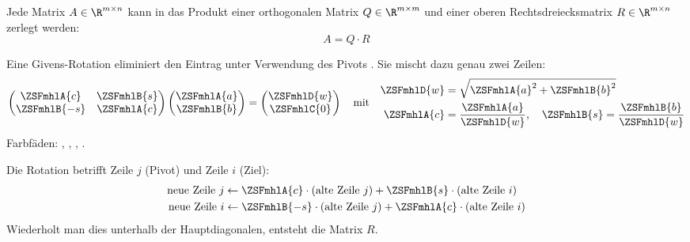 
\begin{defbox}[QR-Zerlegung]
Jede Matrix $A \in \R^{m \times n}$ kann in das Produkt einer orthogonalen Matrix $Q \in \R^{m \times m}$  und einer oberen Rechtsdreiecksmatrix $R \in \R^{m \times n}$ zerlegt werden:
\[ A = Q \cdot R \]
\end{defbox}

\begin{defbox}
Eine Givens-Rotation eliminiert den Eintrag  unter Verwendung des Pivots . Sie mischt dazu genau zwei Zeilen:
\[
\begin{pmatrix} \ZSFmhlA{c} & \ZSFmhlB{s} \\ \ZSFmhlB{-s} & \ZSFmhlA{c} \end{pmatrix}
\begin{pmatrix} \ZSFmhlA{a} \\ \ZSFmhlB{b} \end{pmatrix}
=
\begin{pmatrix} \ZSFmhlD{w} \\ \ZSFmhlC{0} \end{pmatrix}
\quad \text{mit} \quad
\begin{aligned}
\ZSFmhlD{w}&=\sqrt{\ZSFmhlA{a}^2+\ZSFmhlB{b}^2}\\
\ZSFmhlA{c}&=\frac{\ZSFmhlA{a}}{\ZSFmhlD{w}}, \quad \ZSFmhlB{s}=\frac{\ZSFmhlB{b}}{\ZSFmhlD{w}}
\end{aligned}
\]
Farbfäden: , , , .
\ZSFgap[S]

Die Rotation betrifft  Zeile $j$ (Pivot) und Zeile $i$ (Ziel):
\[
\begin{aligned}
\text{neue Zeile } j &\leftarrow \ZSFmhlA{c} \cdot (\text{alte Zeile } j) + \ZSFmhlB{s} \cdot (\text{alte Zeile } i) \\
\text{neue Zeile } i &\leftarrow \ZSFmhlB{-s} \cdot (\text{alte Zeile } j) + \ZSFmhlA{c} \cdot (\text{alte Zeile } i)
\end{aligned}
\]
Wiederholt man dies unterhalb der Hauptdiagonalen, entsteht die Matrix $R$.
\end{defbox}

